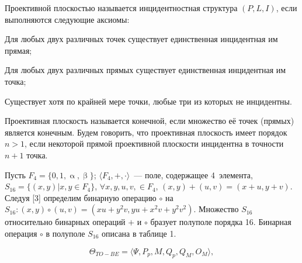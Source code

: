  

\makeProcTitle
{}


Проективной плоскостью называется инцидентностная структура $(P, L, I)$, если выполняются следующие аксиомы:
\begin{description}[noitemsep]\vspace{-6pt}
\item[А1.] Для любых двух различных точек существует единственная инцидентная им прямая;
\item[А2.] Для любых двух различных прямых существует единственная инцидентная им точка;
\item[А3.] Существует хотя по крайней мере точки, любые три из которых не инцидентны.
\end{description}\vspace{-8pt}

Проективная плоскость называется конечной, если множество её точек (прямых) является конечным. Будем говорить, что проективная плоскость имеет порядок $n>1$, если некоторой прямой проективной плоскости инцидентна в точности $n+1$ точка.

Пусть $F_4 = \lbrace0,1,\upalpha,\upbeta\rbrace$; $\langle F_4,+,\cdot \rangle$~--- поле, содержащее 4~элемента,\\ $S_{16} = \lbrace (x,y)|x,y \in F_4 \rbrace$, $\forall x,y,u,v, \in F_4$, $(x,y)+(u,v)=(x+u,y+v)$. Следуя [3] определим бинарную операцию $\circ$ на $S_{16} : (x,y)\circ(u,v) = (xu+y^2v, yu+x^2v+y^2v^2)$. Множество $S_{16}$
относительно бинарных операций $+$ и $\circ$ бразует полуполе порядка 16. Бинарная операция $\circ$ в полуполе $S_{16}$ описана в таблице 1.



% 



\begin{equation}
  \Theta_{TO-BE} = \langle \Psi, P_p, M, Q_p, Q_M, O_M \rangle,
\end{equation}






